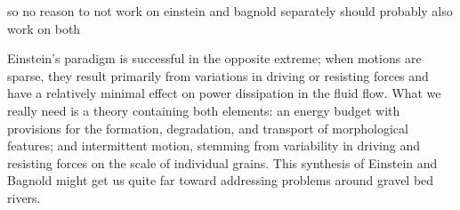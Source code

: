 \documentclass{article}
\begin{document}
so no reason to not work on einstein and bagnold separately 
should probably also work on both



Einstein's paradigm is successful in the opposite extreme; when motions are sparse, they result primarily from variations in driving or resisting forces and have a relatively minimal effect on power dissipation in the fluid flow. 
What we really need is a theory containing both elements: an energy budget with provisions for the formation, degradation, and transport of morphological features; and intermittent motion, stemming from variability in driving and resisting forces on the scale of individual grains. 
This synthesis of Einstein and Bagnold might get us quite far toward addressing problems around gravel bed rivers. 





\end{document}
